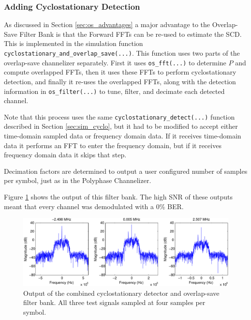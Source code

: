 \documentclass[12pt]{article}
\begin{document}
\subsubsection{Adding Cyclostationary Detection}
\label{sec:sim_os_cyclo}
As discussed in Section \ref{sec:os_advantages} a major advantage to the
Overlap-Save Filter Bank is that the Forward FFTs can be re-used to estimate
the SCD. This is implemented in the simulation function
\texttt{cyclostationary\_and\_overlap\_save(...)}. This function uses two parts of the
overlap-save channelizer separately.  First it uses \texttt{os\_fft(...)} to
determine $P$ and compute overlapped FFTs, then it uses these FFTs to perform
cyclostationary detection, and finally it re-uses the overlapped FFTs, along
with the detection information in \texttt{os\_filter(...)} to tune, filter, and
decimate each detected channel.

Note that this process uses the same \texttt{cyclostationary\_detect(...)}
function described in Section \ref{sec:sim_cyclo}, but it had to be modified to
accept either time-domain sampled data or frequency domain data. If it receives
time-domain data it performs an FFT to enter the frequency domain, but if it
receives frequency domain data it skips that step.

Decimation factors are determined to output a user configured number of samples
per symbol, just as in the Polyphase Channelizer.

Figure \ref{fig:cyclo_os_results} shows the output of this filter bank. The
high SNR of these outputs meant that every channel was demodulated with a 0\%
BER.

\begin{figure}[bh!]
    \includegraphics[width=\textwidth]{cyclo_os_results}%
    \caption{Output of the combined cyclostationary detector and overlap-save filter bank. All three test signals sampled at four samples per symbol.}
    \label{fig:cyclo_os_results}
\end{figure}
\end{document}
